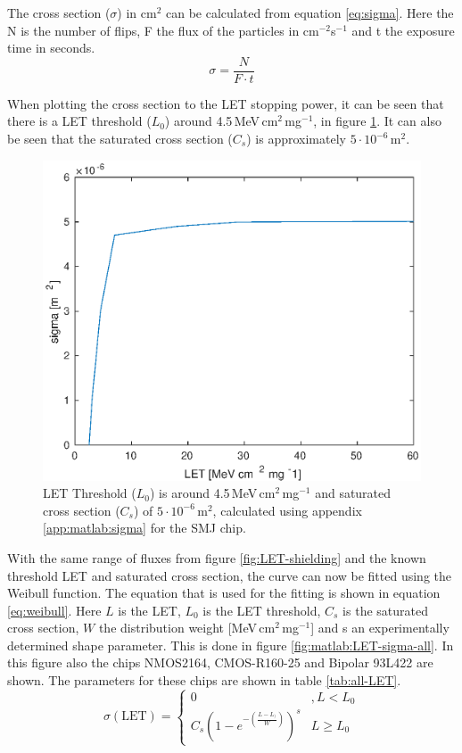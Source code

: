 The cross section ($\sigma$) in cm$^2$ can be calculated from equation \ref{eq:sigma}. Here the N is the number of flips, F the flux of the particles in cm$^{-2}$s$^{-1}$ and t the exposure time in seconds.
\begin{equation}
\sigma = \frac{N}{F \cdot t} \label{eq:sigma}
\end{equation}

When plotting the cross section to the LET stopping power, it can be seen that there is a LET threshold ($L_0$) around 4.5\,MeV\,cm$^2$\,mg$^{-1}$, in figure \ref{fig:matlab:LET-sigma}. It can also be seen that the saturated cross section ($C_s$) is approximately $5 \cdot 10^{-6}$\,m$^2$.
\begin{figure}[H]
\centering
\includegraphics[width=.7\textwidth]{data/sigma/L0.eps}
\caption{LET Threshold ($L_0$) is around 4.5\,MeV\,cm$^2$\,mg$^{-1}$ and saturated cross section ($C_s$) of $5 \cdot 10^{-6}$\,m$^2$, calculated using appendix \ref{app:matlab:sigma} for the SMJ chip.}
\label{fig:matlab:LET-sigma}
\end{figure}

With the same range of fluxes from figure \ref{fig:LET-shielding} and the known threshold LET and saturated cross section, the curve can now be fitted using the Weibull function. The equation that is used for the fitting is shown in equation \ref{eq:weibull}. Here $L$ is the LET, $L_0$ is the LET threshold, $C_s$ is the saturated cross section, $W$ the distribution weight [MeV\,cm$^2$\,mg$^{-1}$] and s an experimentally determined shape parameter. This is done in figure \ref{fig:matlab:LET-sigma-all}. In this figure also the chips NMOS2164, CMOS-R160-25 and Bipolar 93L422 are shown. The parameters for these chips are shown in table \ref{tab:all-LET}.
\begin{equation}
\sigma(\text{LET}) = \begin{cases}0 & , L < L_0 \\ C_s \left( 1- e^{-\left( \frac{L - L_)}{W}\right)} \right)^s & L \geq L_0 \end{cases} \label{eq:weibull}
\end{equation}


